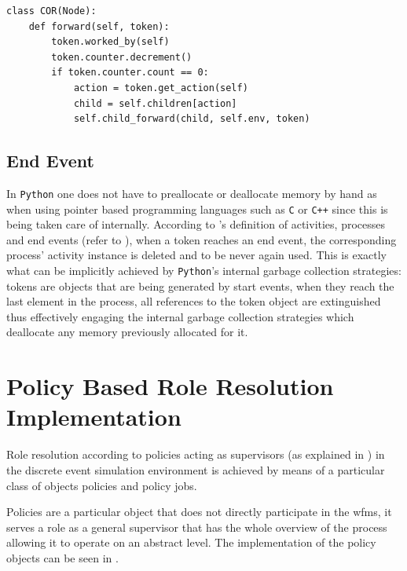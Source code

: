 \begin{lstlisting}[caption=Token's counter decrement logic at a convergent \glsentryshort{or} gateway,label=lst:or_counter_decrement,style=CustomPython]
class COR(Node):
    def forward(self, token):
        token.worked_by(self)
        token.counter.decrement()
        if token.counter.count == 0:
            action = token.get_action(self)
            child = self.children[action]
            self.child_forward(child, self.env, token)
\end{lstlisting}

\subsection{End Event}

In \texttt{Python} one does not have to preallocate or deallocate memory by hand as when using pointer based programming languages such as \texttt{C} or \texttt{C++} since this is being taken care of internally. According to \citet{Silver2011}'s definition of activities, processes and end events (refer to ), when a token reaches an end event, the corresponding process' activity instance is deleted and to be never again used. This is exactly what can be implicitly achieved by \texttt{Python}'s internal garbage collection strategies: tokens are objects that are being generated by start events, when they reach the last element in the process, all references to the token object are extinguished thus effectively engaging the internal garbage collection strategies which deallocate any memory previously allocated for it.

\section{Policy Based Role Resolution Implementation}
\label{sec:policy_implementation}
Role resolution according to policies acting as supervisors (as explained in ) in the discrete event simulation environment is achieved by means of a particular class of objects \ie policies and policy jobs.

Policies are a particular object that does not directly participate in the \gls{wfms}, it serves a role as a general supervisor that has the whole overview of the process allowing it to operate on an abstract level. The implementation of the policy objects can be seen in .


